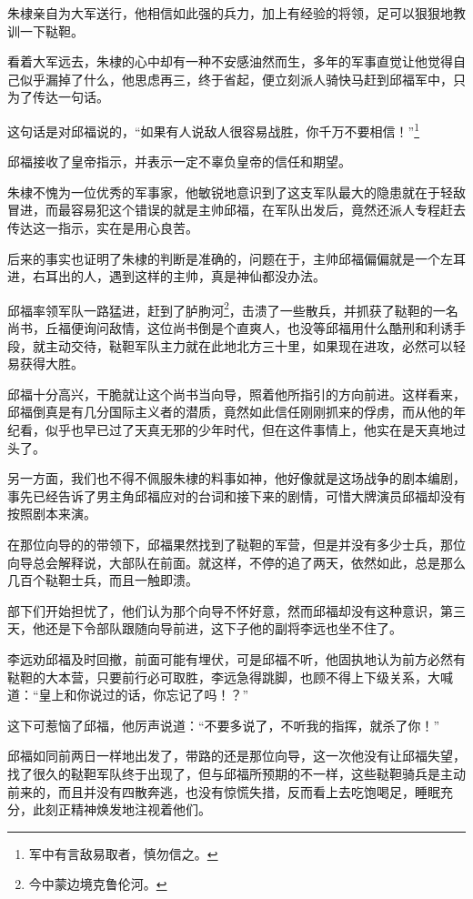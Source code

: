 \begin{multicols}{\theparacolNo}
朱棣亲自为大军送行，他相信如此强的兵力，加上有经验的将领，足可以狠狠地教训一下鞑靼。

看着大军远去，朱棣的心中却有一种不安感油然而生，多年的军事直觉让他觉得自己似乎漏掉了什么，他思虑再三，终于省起，便立刻派人骑快马赶到邱福军中，只为了传达一句话。

这句话是对邱福说的，“如果有人说敌人很容易战胜，你千万不要相信！”\footnote{军中有言敌易取者，慎勿信之。}

邱福接收了皇帝指示，并表示一定不辜负皇帝的信任和期望。

朱棣不愧为一位优秀的军事家，他敏锐地意识到了这支军队最大的隐患就在于轻敌冒进，而最容易犯这个错误的就是主帅邱福，在军队出发后，竟然还派人专程赶去传达这一指示，实在是用心良苦。

后来的事实也证明了朱棣的判断是准确的，问题在于，主帅邱福偏偏就是一个左耳进，右耳出的人，遇到这样的主帅，真是神仙都没办法。

邱福率领军队一路猛进，赶到了胪朐河\footnote{今中蒙边境克鲁伦河。}，击溃了一些散兵，并抓获了鞑靼的一名尚书，丘福便询问敌情，这位尚书倒是个直爽人，也没等邱福用什么酷刑和利诱手段，就主动交待，鞑靼军队主力就在此地北方三十里，如果现在进攻，必然可以轻易获得大胜。

邱福十分高兴，干脆就让这个尚书当向导，照着他所指引的方向前进。这样看来，邱福倒真是有几分国际主义者的潜质，竟然如此信任刚刚抓来的俘虏，而从他的年纪看，似乎也早已过了天真无邪的少年时代，但在这件事情上，他实在是天真地过头了。

另一方面，我们也不得不佩服朱棣的料事如神，他好像就是这场战争的剧本编剧，事先已经告诉了男主角邱福应对的台词和接下来的剧情，可惜大牌演员邱福却没有按照剧本来演。

在那位向导的的带领下，邱福果然找到了鞑靼的军营，但是并没有多少士兵，那位向导总会解释说，大部队在前面。就这样，不停的追了两天，依然如此，总是那么几百个鞑靼士兵，而且一触即溃。

部下们开始担忧了，他们认为那个向导不怀好意，然而邱福却没有这种意识，第三天，他还是下令部队跟随向导前进，这下子他的副将李远也坐不住了。

李远劝邱福及时回撤，前面可能有埋伏，可是邱福不听，他固执地认为前方必然有鞑靼的大本营，只要前行必可取胜，李远急得跳脚，也顾不得上下级关系，大喊道：“皇上和你说过的话，你忘记了吗！？”

这下可惹恼了邱福，他厉声说道：“不要多说了，不听我的指挥，就杀了你！”

邱福如同前两日一样地出发了，带路的还是那位向导，这一次他没有让邱福失望，找了很久的鞑靼军队终于出现了，但与邱福所预期的不一样，这些鞑靼骑兵是主动前来的，而且并没有四散奔逃，也没有惊慌失措，反而看上去吃饱喝足，睡眠充分，此刻正精神焕发地注视着他们。


\end{multicols}
